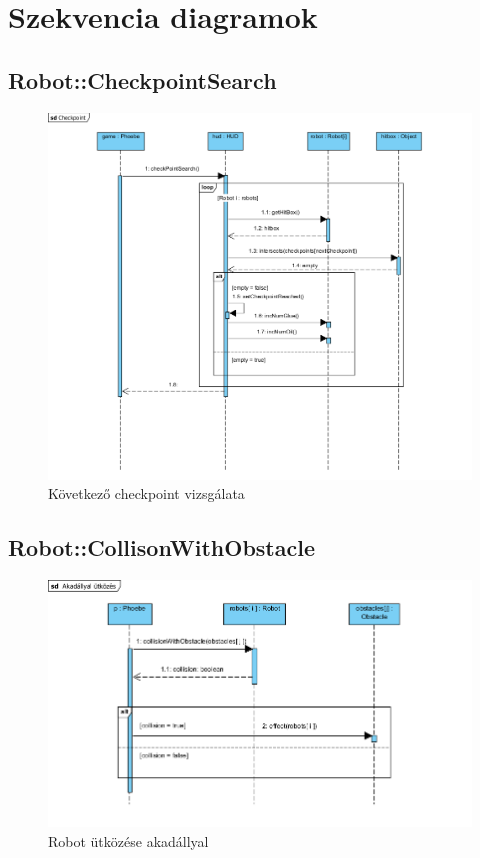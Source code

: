\section{Szekvencia diagramok}

\subsection{Robot::CheckpointSearch}
\begin{figure}[h]
\begin{center}
\includegraphics[width=17cm]{images/CheckpointSearch.PNG}
\caption{Következő checkpoint vizsgálata}
\label{fig:example2}
\end{center}
\end{figure}
\pagebreak

\subsection{Robot::CollisonWithObstacle}
\begin{figure}[h]
\begin{center}
\includegraphics[width=17cm]{images/collisionWithObstacle()_sequence.PNG}
\caption{Robot ütközése akadállyal}
\label{fig:example4}
\end{center}
\end{figure}
\pagebreak


